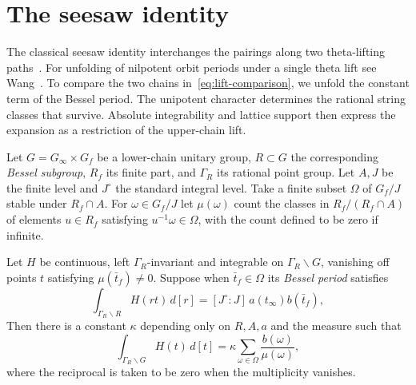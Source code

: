 \section{The seesaw identity}
\label{sec:a-seesaw}

The classical seesaw identity interchanges the pairings along two theta-lifting paths~\cite{Kudla1984}. For unfolding of nilpotent orbit periods under a single theta lift see Wang~\cite[Theorem~4.5]{Wang2025}. To compare the two chains in~\eqref{eq:lift-comparison}, we unfold the constant term of the Bessel period. The unipotent character determines the rational string classes that survive. Absolute integrability and lattice support then express the expansion as a restriction of the upper-chain lift.

\begin{lemma}
\label{lem:a-seesaw-cut-integral}
\emitthmsource
Let $G=G_\infty\times G_f$ be a lower-chain unitary group, $R\subset G$ the corresponding \emph{Bessel subgroup}, $R_f$ its finite part, and $\Gamma_R$ its rational point group. Let $A,J$ be the finite level and $J^\circ$ the standard integral level. Take a finite subset $\Omega$ of $G_f/J$ stable under $R_f\cap A$. For $\omega\in G_f/J$ let $\mu(\omega)$ count the classes in $R_f/(R_f\cap A)$ of elements $u\in R_f$ satisfying $u^{-1}\omega\in\Omega$, with the count defined to be zero if infinite.

Let $H$ be continuous, left $\Gamma_R$-invariant and integrable on $\Gamma_R\backslash G$, vanishing off points $t$ satisfying $\mu(\bar t_f)\ne0$. Suppose when $\bar t_f\in\Omega$ its \emph{Bessel period} satisfies
\[
 \int_{\Gamma_R\backslash R}H(rt)\,d[r]
     =[J^\circ:J]\, a(t_\infty)b(\bar t_f),
\]
Then there is a constant $\kappa$ depending only on $R,A,a$ and the measure such that
\[
 \int_{\Gamma_R\backslash G} H(t)\,d[t]
   =\kappa\sum_{\omega\in\Omega}\frac{b(\omega)}{\mu(\omega)} ,
\]
where the reciprocal is taken to be zero when the multiplicity vanishes.
\end{lemma}
